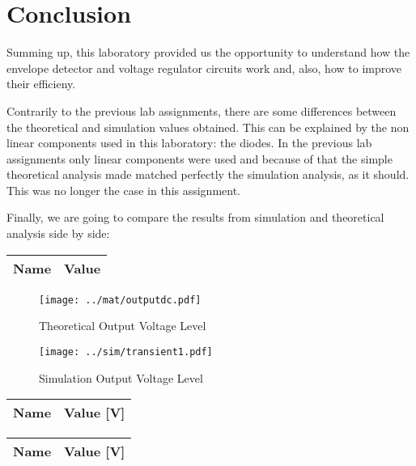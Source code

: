 \section{Conclusion}
\label{sec:conclusion}

Summing up, this laboratory provided us the opportunity to understand how the envelope detector and voltage regulator circuits work and, also, how to improve their efficieny.\par
Contrarily to the previous lab assignments, there are some differences between the theoretical and simulation values obtained. This can be explained by the non linear components used in this laboratory: the diodes. In the previous lab assignments only linear components were used and because of that the simple theoretical analysis made matched perfectly the simulation analysis, as it should. This was no longer the case in this assignment. \par
Finally, we are going to compare the results from simulation and theoretical analysis side by side: \par

\begin{center}
  \begin{tabular}{ | c | c | }
    \hline    
    {\bf Name} & {\bf Value} \\ \hline
    
    \hline
  \end{tabular}
\end{center}

\begin{figure}[H]
      \texttt{[image: ../mat/outputdc.pdf]}
      \caption{Theoretical Output Voltage Level}
    \endminipage\hfill
      \texttt{[image: ../sim/transient1.pdf]}
      \caption{Simulation Output Voltage Level}
    \endminipage\hfill
\end{figure}

\begin{center}
  \begin{tabular}{ | c | c | }
    \hline    
    {\bf Name} & {\bf Value [V]} \\ \hline
    
  \end{tabular}
\end{center}

\begin{center}
  \begin{tabular}{ | c | c | }
    \hline    
    {\bf Name} & {\bf Value [V]} \\ \hline
    
  \end{tabular}
\end{center}

